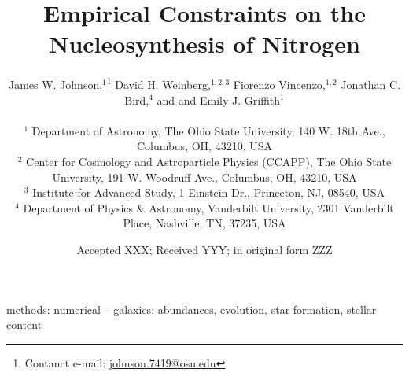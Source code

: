 \documentclass[fleqn, usenatbib]{mnras}
\title[Empirical Constraints on the Nucleosynthesis of Nitrogen]{Empirical
Constraints on the Nucleosynthesis of Nitrogen}
\author[J.W. Johnson et al.]{James W. Johnson,$^{1}$\thanks{
	Contanct e-mail: \href{mailto:
	johnson.7419@osu.edu}{johnson.7419@osu.edu}}
	David H. Weinberg,$^{1, 2, 3}$
	Fiorenzo Vincenzo,$^{1, 2}$
	Jonathan C. Bird,$^{4}$ and
	\newauthor
	and Emily J. Griffith$^{1}$
	\\ \null \\
	$^{1}$ Department of Astronomy, The Ohio State University,
	140 W. 18th Ave., Columbus, OH, 43210, USA
	\\
	$^{2}$ Center for Cosmology and Astroparticle Physics (CCAPP),
	The Ohio State University, 191 W. Woodruff Ave., Columbus, OH, 43210, USA
	\\
	$^{3}$ Institute for Advanced Study, 1 Einstein Dr., Princeton, NJ, 08540,
	USA
	\\
	$^{4}$ Department of Physics \& Astronomy, Vanderbilt University,
	2301 Vanderbilt Place, Nashville, TN, 37235, USA
}
\date{Accepted XXX; Received YYY; in original form ZZZ}
\begin{document}
\label{firstpage}
\pagerange{\pageref{firstpage}--\pageref{lastpage}}
\maketitle



\begin{keywords}
methods: numerical -- galaxies: abundances, evolution, star formation, stellar
content
\end{keywords}











\begin{appendices}

\end{appendices}

\label{lastpage}
\end{document}

